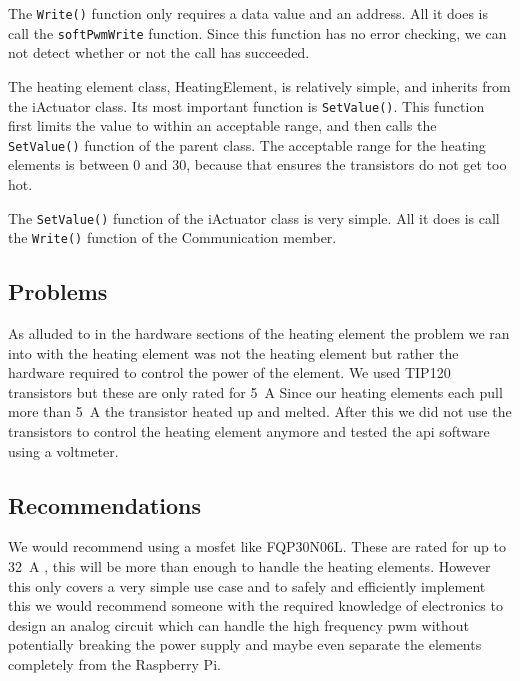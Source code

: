 \documentclass[a4paper,oneside]{book}
\begin{document}


The \lstinline|Write()| function only requires a data value and an address. All
it does is call the \lstinline|softPwmWrite| function. Since this function has
no error checking, we can not detect whether or not the call has succeeded.



The heating element class, HeatingElement, is relatively simple, and inherits
from the iActuator class. Its most important function is
\lstinline|SetValue()|. This function first limits the value to within an
acceptable range, and then calls the \lstinline|SetValue()| function of the
parent class. The acceptable range for the heating elements is between 0 and
30, because that ensures the transistors do not get too hot.



The \lstinline|SetValue()| function of the iActuator class is very simple. All
it does is call the \lstinline|Write()| function of the Communication member.



\subsection{Problems}
As alluded to in the hardware sections of the heating element the problem we
ran into with the heating element was not the heating element but rather the
hardware required to control the power of the element. We used TIP120
transistors but these are only rated for \SI{5}{\ampere} \cite{Transistor}
Since our heating elements each pull more than \SI{5}{\ampere} \cite{Heating}
the transistor heated up and melted. After this we did not use the transistors
to control the heating element anymore and tested the api software using a
voltmeter. 

\subsection{Recommendations}
We would recommend using a mosfet like FQP30N06L. These are rated for up to
\SI{32}{\ampere} \cite{FQP30N06L}, this will be more than enough to handle the
heating elements. However this only covers a very simple use case and to safely
and efficiently implement this we would recommend someone with the required
knowledge of electronics  to design an analog circuit which can handle the high
frequency pwm without potentially breaking the power supply and maybe even
separate the elements completely from the Raspberry Pi.   
\end{document}
